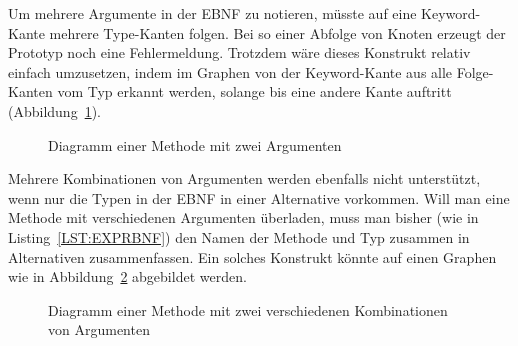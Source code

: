 \documentclass[../InterneDSLs.tex]{subfiles}
\begin{document}
Um mehrere Argumente in der EBNF zu notieren, müsste auf eine Keyword-Kante mehrere Type-Kanten folgen. Bei so einer Abfolge von Knoten erzeugt der Prototyp noch eine Fehlermeldung. Trotzdem wäre dieses Konstrukt relativ einfach umzusetzen, indem im Graphen von der Keyword-Kante aus alle Folge-Kanten vom Typ \gqq{TYPE]} erkannt werden, solange bis eine andere Kante auftritt (Abbildung~\ref{FIG:DiagramMethodTwoArguments}).

\begin{figure}[ht]
\centering
{}
\caption{Diagramm einer Methode mit zwei Argumenten}
\label{FIG:DiagramMethodTwoArguments}
\end{figure}

Mehrere Kombinationen von Argumenten werden ebenfalls nicht unterstützt, wenn nur die Typen in der EBNF in einer Alternative vorkommen. Will man eine Methode mit verschiedenen Argumenten überladen, muss man bisher (wie in Listing~\ref{LST:EXPRBNF}) den Namen der Methode und Typ zusammen in Alternativen zusammenfassen. Ein solches Konstrukt könnte auf einen Graphen wie in Abbildung~\ref{FIG:DiagramMethodTwoCombinationsArguments} abgebildet werden.
\begin{figure}[ht]
\centering
{}
\caption{Diagramm einer Methode mit zwei verschiedenen Kombinationen von Argumenten}
\label{FIG:DiagramMethodTwoCombinationsArguments}
\end{figure}
\end{document}
